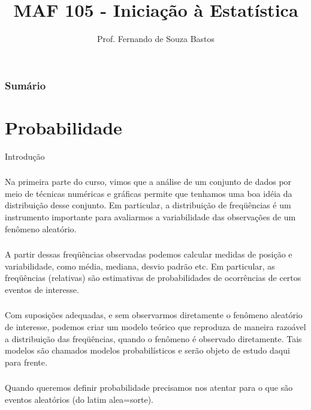 \documentclass[14pt,aspectratio=1610]{beamer}
\title{MAF 105 - Iniciação à Estatística}
\author{Prof. Fernando de Souza Bastos}
\institute{Instituto de Ciências Exatas e Tecnológicas\texorpdfstring{\\ Universidade Federal de Viçosa}{}\texorpdfstring{\\ Campus UFV - Florestal}{}}
\date[\today]{}
\begin{document}


\frame{\titlepage}

\begin{frame}{}
\frametitle{\bf Sumário}
\tableofcontents
\end{frame}

\section{Probabilidade}
\begin{frame}{Introdução}
\frametitle{}
\begin{block}{}
\justifying
Na primeira parte do curso, vimos que a análise de um conjunto de dados por
meio de técnicas numéricas e gráficas permite que tenhamos uma boa idéia da distribuição desse conjunto. Em particular, a distribuição de freqüências é um instrumento
importante para avaliarmos a variabilidade das observações de um fenômeno aleatório.
\end{block}
\end{frame}

\begin{frame}{}
\frametitle{}
\begin{block}{}
\justifying
A partir dessas freqüências observadas podemos calcular medidas de posição e
variabilidade, como média, mediana, desvio padrão etc. Em particular, as freqüências (relativas) são estimativas de probabilidades de ocorrências
de certos eventos de interesse.
\end{block}
\end{frame}

\begin{frame}{}
\frametitle{}
\begin{block}{}
\justifying
Com suposições adequadas, e sem observarmos diretamente o fenômeno aleatório de interesse, podemos criar um modelo teórico que reproduza de maneira razoável a distribuição das freqüências, quando o fenômeno é observado diretamente. Tais modelos são chamados modelos probabilísticos e serão objeto de estudo daqui para frente.
\end{block}
\end{frame}

\begin{frame}{}
\frametitle{}
\begin{block}{}
\justifying
Quando queremos definir probabilidade precisamos nos atentar para o que são eventos aleatórios (do latim alea=sorte). 

\end{block}
\end{frame}
\end{document}
